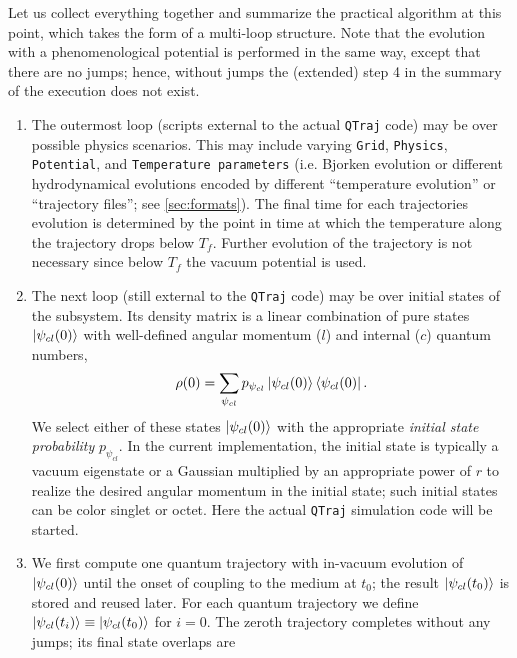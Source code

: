 \documentclass[times,sort&compress,final]{elsarticle}
\newcommand{\redflag}[1]{{\color{red} #1}}
\def\qtraj{{\tt QTraj} }
\begin{document}
Let us collect everything together and summarize the practical algorithm at this point, 
which takes the form of a multi-loop structure. 
Note that the evolution with a phenomenological potential is performed in the same way, 
except that there are no jumps; hence, without jumps the (extended) step 4 in the 
summary of the execution does not exist.

\begin{enumerate}
    \item
    The outermost loop (scripts external to the actual \qtraj code) \redflag{may be} over possible physics scenarios. 
    This may include varying \texttt{Grid}, \texttt{Physics}, 
    \texttt{Potential}, and \texttt{Temperature parameters} (i.e. Bjorken 
    evolution or different hydrodynamical evolutions encoded by different 
    ``temperature evolution'' or ``trajectory files''; see \ref{sec:formats}). 
    The final time for each trajectories evolution is determined by the point in time at which the temperature along the trajectory drops below $T_f$.  Further evolution of the trajectory is not necessary since below $T_f$ the vacuum potential is used.
    \item
    The next loop (still external to the \qtraj code) \redflag{may be} over initial states of the subsystem. 
    Its density matrix is a linear combination of pure states $\ket{ \psi_{cl}(0) }$ 
    with well-defined angular momentum ($l$) and internal ($c$) quantum numbers,
    \begin{equation}
        \rho(0) = \sum_{\psi_{cl}} p_{\psi_{cl}} \ket{ \psi_{cl}(0) } \bra{ \psi_{cl}(0) }.
    \end{equation}
    We select either of these states $\ket{ \psi_{cl}(0) }$ with the appropriate 
    \emph{initial state probability} $p_{\psi_{cl}}$.
    In the current implementation, the initial state is typically a vacuum eigenstate or a Gaussian multiplied by an appropriate 
    power of $r$ to realize the desired angular momentum in the initial state; such initial states can be 
    color singlet or octet.
    Here the actual \qtraj simulation code will be started. 
    \item
    We first compute one quantum trajectory with in-vacuum evolution of $\ket{ \psi_{cl}(0) }$ 
    until the onset of coupling to the medium at $t_0$; the result $\ket{ \psi_{cl}(t_0) }$ 
    is stored and reused later. 
    For each quantum trajectory we define $\ket{ \psi_{cl}(t_{i}) } \equiv \ket{ \psi_{cl}(t_0) }$ 
    for $i=0$. 
    The zeroth trajectory completes without any jumps; its final state overlaps are 

\end{enumerate}
\end{document}
